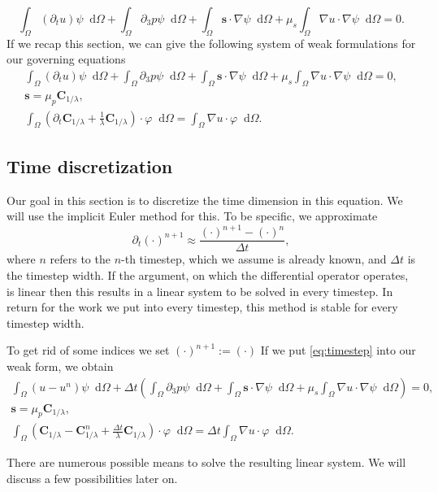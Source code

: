 \documentclass[12pt,a4paper,twoside, open=right]{scrreprt}
\theoremstyle{definition}
\theoremstyle{plain}
\newcommand{\bfs}{\bm{s}}
\newcommand{\bfC}{\bm{C}}
\newcommand{\D}{\mathop{}\!\mathrm{d}}
\begin{document}
\begin{equation}
    \int_\Omega(\partial_t u)\psi\D\Omega +\int_\Omega\partial_3 p\psi\D\Omega + \int_\Omega\bfs\cdot\nabla\psi\D\Omega+\mu_s\int_\Omega\nabla u\cdot\nabla\psi\D\Omega = 0.
\end{equation}
If we recap this section, we can give the following system of weak formulations for our governing equations
\begin{align}
     \int_\Omega(\partial_t u)\psi\D\Omega +\int_\Omega\partial_3 p\psi\D\Omega + \int_\Omega\bfs\cdot\nabla\psi\D\Omega+\mu_s\int_\Omega\nabla u\cdot\nabla\psi\D\Omega = 0,\\
     \bfs =\mu_p\bfC_{1/\lambda},\\
      \int_\Omega(\partial_t\bfC_{1/\lambda}+\frac{1}{\lambda}\bfC_{1/\lambda})\cdot\varphi\D\Omega = 
     \int_\Omega \nabla u\cdot\varphi\D\Omega.
\end{align}

\subsection{Time discretization}
Our goal in this section is to discretize the time dimension in this equation. We will use the implicit Euler method for this. To be specific, we approximate 
\begin{equation}
    \partial_t(\cdot)^{n+1}\approx\frac{(\cdot)^{n+1}-(\cdot)^n}{\Delta t},\label{eq:timestep}
\end{equation}
where $n$ refers to the $n$-th timestep, which we assume is already known, and $\Delta t$ is the timestep width. If the argument, on which the differential operator operates, is linear then this results in a linear system to be solved in every timestep. In return for the work we put into every timestep, this method is stable for every timestep width.
\par 
To get rid of some indices we set $(\cdot)^{n+1}:=(\cdot)$ If we put \eqref{eq:timestep} into our weak form, we obtain 
\begin{align}
  \int_\Omega(u-u^n)\psi\D\Omega +\Delta t\left(\int_\Omega\partial_3 p\psi\D\Omega + \int_\Omega\bfs\cdot\nabla\psi\D\Omega+\mu_s\int_\Omega\nabla u\cdot\nabla\psi\D\Omega\right) = 0,\\
  \bfs =\mu_p\bfC_{1/\lambda},\\
  \int_\Omega(\bfC_{1/\lambda} - \bfC_{1/\lambda}^n +\frac{\Delta t}{\lambda}\bfC_{1/\lambda})\cdot\varphi\D\Omega = 
  \Delta t\int_\Omega\nabla u\cdot\varphi\D\Omega.
\end{align}
\par 
There are numerous possible means to solve the resulting linear system. We will discuss a few possibilities later on.
\end{document}
